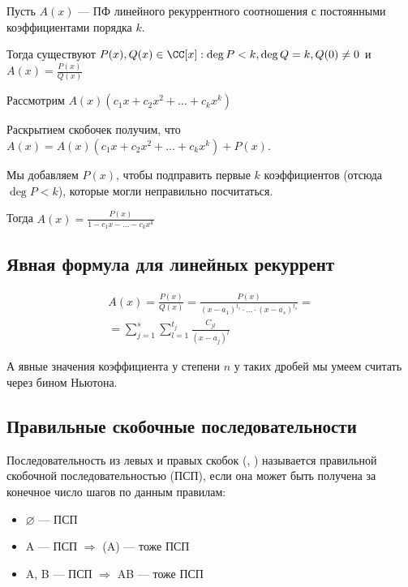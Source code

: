 \begin{thrm}{}{}
    Пусть \( A(x) \) --- ПФ линейного рекуррентного соотношения с постоянными коэффициентами порядка \( k \).

    Тогда существуют \( P(x), Q(x) \in \CC[x] : \deg P < k, \deg Q = k, Q(0) \neq 0 \) и \( A(x) = \frac{P(x)}{Q(x)} \)
\end{thrm}

Рассмотрим \( A(x) (c_1 x + c_2 x^2 + \ldots + c_k x^k) \)

Раскрытием скобочек получим, что \( A(x) = A(x) (c_1 x + c_2 x^2 + \ldots + c_k x^k) + P(x) \).

Мы добавляем \( P(x) \), чтобы подправить первые \( k \) коэффициентов (отсюда \( \deg P < k \)), которые могли неправильно посчитаться.

Тогда \( A(x) = \frac{P(x)}{1 - c_1 x - \ldots - c_k x^k} \)

\subsection{Явная формула для линейных рекуррент}

\begin{gather*}
    A(x)
    =
    \frac{P(x)}{Q(x)}
    =
    \frac{P(x)}{(x - a_1)^{t_1} \cdot \ldots \cdot (x - a_s)^{t_s}}
    =
    \\
    =
    \sum\limits_{j = 1}^{s} \sum\limits_{l = 1}^{t_j} \frac{C_{jl}}{(x - a_j)^l}
\end{gather*}

А явные значения коэффициента у степени \( n \) у таких дробей мы умеем считать через бином Ньютона.

\subsection{Правильные скобочные последовательности}

Последовательность из левых и правых скобок (, ) называется правильной скобочной последовательностью (ПСП),
если она может быть получена за конечное число шагов по данным правилам:
\begin{itemize}
    \item
        \( \varnothing \) --- ПСП
    \item
        A --- ПСП \( \Rightarrow \) (A) --- тоже ПСП
    \item
        A, B --- ПСП \( \Rightarrow \) AB --- тоже ПСП
\end{itemize}

